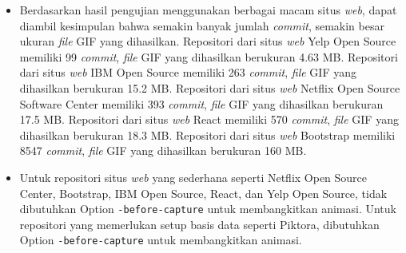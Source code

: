 \begin{itemize}

\item Berdasarkan hasil pengujian menggunakan berbagai macam situs \textit{web}, dapat diambil kesimpulan bahwa semakin banyak jumlah \textit{commit}, semakin besar ukuran \textit{file} GIF yang dihasilkan. Repositori dari situs \textit{web} Yelp Open Source memiliki 99 \textit{commit}, \textit{file} GIF yang dihasilkan berukuran 4.63 MB. Repositori dari situs \textit{web} IBM Open Source memiliki 263  \textit{commit}, \textit{file} GIF yang dihasilkan berukuran 15.2 MB. Repositori dari situs \textit{web} Netflix Open Source Software Center memiliki 393  \textit{commit}, \textit{file} GIF yang dihasilkan berukuran 17.5 MB. Repositori dari situs \textit{web} React  memiliki 570  \textit{commit}, \textit{file} GIF yang dihasilkan berukuran 18.3 MB. Repositori dari situs \textit{web} Bootstrap  memiliki 8547  \textit{commit}, \textit{file} GIF yang dihasilkan berukuran 160 MB.
 
\item Untuk repositori situs \textit{web} yang sederhana seperti Netflix Open Source Center, Bootstrap, IBM Open Source, React, dan Yelp Open Source, tidak dibutuhkan Option \texttt{-before-capture} untuk membangkitkan animasi. Untuk repositori yang memerlukan setup basis data seperti Piktora, dibutuhkan Option \texttt{-before-capture} untuk membangkitkan animasi. 
 
\end{itemize}

